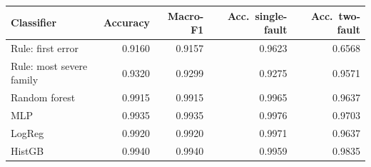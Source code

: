 \begin{tabular}{lrrrr}
\toprule
\textbf{Classifier} & \textbf{Accuracy} & \textbf{Macro-F1} & \textbf{Acc.\ single-fault} & \textbf{Acc.\ two-fault}\\
\midrule
Rule: first error & 0.9160 & 0.9157 & 0.9623 & 0.6568\\
Rule: most severe family & 0.9320 & 0.9299 & 0.9275 & 0.9571\\
Random forest & 0.9915 & 0.9915 & 0.9965 & 0.9637\\
MLP & 0.9935 & 0.9935 & 0.9976 & 0.9703\\
LogReg & 0.9920 & 0.9920 & 0.9971 & 0.9637\\
HistGB & 0.9940 & 0.9940 & 0.9959 & 0.9835\\\bottomrule
\end{tabular}
